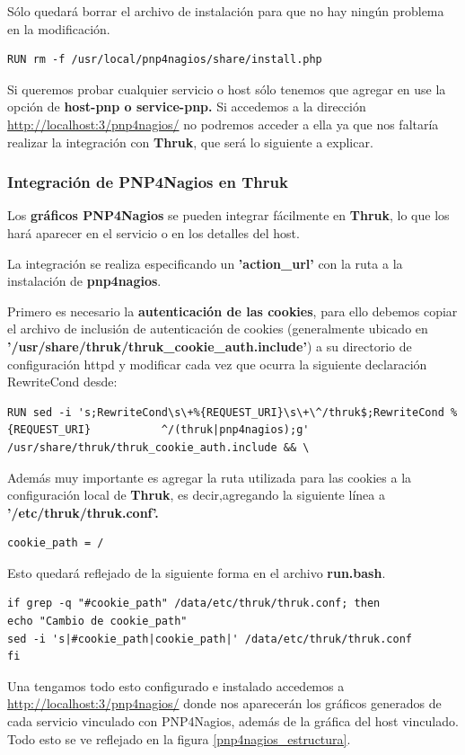 Sólo quedará borrar el archivo de instalación para que no hay ningún problema en la modificación.
\begin{lstlisting}
RUN rm -f /usr/local/pnp4nagios/share/install.php
\end{lstlisting}
Si queremos probar cualquier servicio o host sólo tenemos que agregar en use la opción de \textbf{host-pnp o service-pnp.}
Si accedemos a la dirección \url{http://localhost:3/pnp4nagios/} no podremos acceder a ella ya que nos faltaría realizar la integración con \textbf{Thruk}, que será lo siguiente a explicar.
\subsubsection{Integración de PNP4Nagios en Thruk}

Los \textbf{gráficos PNP4Nagios} se pueden integrar fácilmente en \textbf{Thruk}, lo que los hará aparecer en el servicio o en los detalles del host.

La integración se realiza especificando un \textbf{'action\_url'} con la ruta a la instalación de \textbf{pnp4nagios}.

Primero es necesario la \textbf{autenticación de las cookies}, para ello debemos copiar el archivo de inclusión de autenticación de cookies (generalmente ubicado en \textbf{'/usr/share/thruk/thruk\_cookie\_auth.include'}) a su directorio de configuración httpd y modificar cada vez que ocurra la siguiente declaración RewriteCond desde:
\begin{lstlisting}
RUN sed -i 's;RewriteCond\s\+%{REQUEST_URI}\s\+\^/thruk$;RewriteCond %{REQUEST_URI}           ^/(thruk|pnp4nagios);g' /usr/share/thruk/thruk_cookie_auth.include && \
\end{lstlisting}
\newpage
Además muy importante es agregar la ruta utilizada para las cookies a la configuración local de \textbf{Thruk}, es decir,agregando la siguiente línea a \textbf{'/etc/thruk/thruk.conf'.}
\begin{lstlisting}
cookie_path = /
\end{lstlisting}
Esto quedará reflejado de la siguiente forma en el archivo \textbf{run.bash}.
\begin{lstlisting}
if grep -q "#cookie_path" /data/etc/thruk/thruk.conf; then
echo "Cambio de cookie_path"
sed -i 's|#cookie_path|cookie_path|' /data/etc/thruk/thruk.conf
fi
\end{lstlisting}
Una tengamos todo esto configurado e instalado accedemos a \url{http://localhost:3/pnp4nagios/} donde nos aparecerán los gráficos generados de cada servicio vinculado con PNP4Nagios, además de la gráfica del host vinculado. Todo esto se ve reflejado en la figura \ref{pnp4nagios_estructura}.

